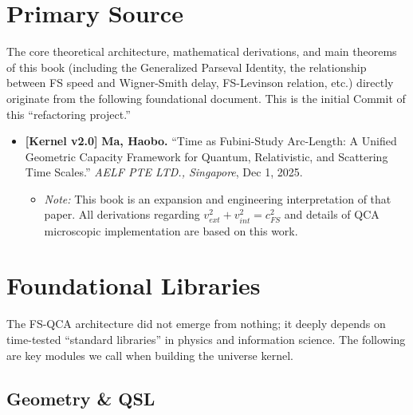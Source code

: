 \documentclass[11pt,a4paper,twoside]{book}
\begin{document}
\section{Primary Source}

The core theoretical architecture, mathematical derivations, and main theorems of this book (including the Generalized Parseval Identity, the relationship between FS speed and Wigner-Smith delay, FS-Levinson relation, etc.) directly originate from the following foundational document. This is the initial Commit of this ``refactoring project.''

\begin{itemize}
\item \textbf{[Kernel v2.0]} \textbf{Ma, Haobo.} ``Time as Fubini-Study Arc-Length: A Unified Geometric Capacity Framework for Quantum, Relativistic, and Scattering Time Scales.'' \textit{AELF PTE LTD., Singapore}, Dec 1, 2025.

\begin{itemize}
\item \textit{Note:} This book is an expansion and engineering interpretation of that paper. All derivations regarding $v_{ext}^2 + v_{int}^2 = c_{FS}^2$ and details of QCA microscopic implementation are based on this work.
\end{itemize}
\end{itemize}

\section{Foundational Libraries}

The FS-QCA architecture did not emerge from nothing; it deeply depends on time-tested ``standard libraries'' in physics and information science. The following are key modules we call when building the universe kernel.

\subsection{Geometry \& QSL}
\end{document}
